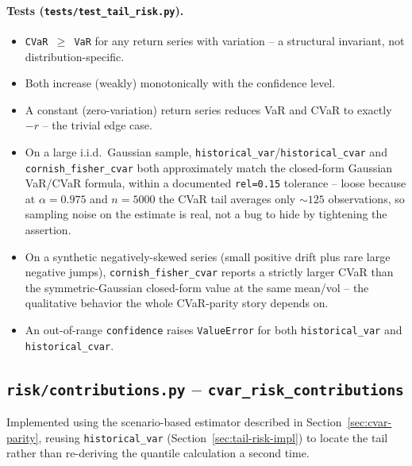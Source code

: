 \documentclass[11pt]{article}
\begin{document}
\paragraph{Tests (\texttt{tests/test\_tail\_risk.py}).}
\begin{itemize}
    \item \texttt{CVaR $\geq$ VaR} for any return series with variation
    -- a structural invariant, not distribution-specific.
    \item Both increase (weakly) monotonically with the confidence
    level.
    \item A constant (zero-variation) return series reduces VaR and
    CVaR to exactly $-r$ -- the trivial edge case.
    \item On a large i.i.d.\ Gaussian sample, \texttt{historical\_var}/\texttt{historical\_cvar}
    and \texttt{cornish\_fisher\_cvar} both approximately match the
    closed-form Gaussian VaR/CVaR formula, within a documented
    \texttt{rel=0.15} tolerance -- loose because at $\alpha=0.975$ and
    $n=5000$ the CVaR tail averages only $\sim 125$ observations, so
    sampling noise on the estimate is real, not a bug to hide by
    tightening the assertion.
    \item On a synthetic negatively-skewed series (small positive drift
    plus rare large negative jumps), \texttt{cornish\_fisher\_cvar}
    reports a strictly larger CVaR than the symmetric-Gaussian
    closed-form value at the same mean/vol -- the qualitative behavior
    the whole CVaR-parity story depends on.
    \item An out-of-range \texttt{confidence} raises \texttt{ValueError}
    for both \texttt{historical\_var} and \texttt{historical\_cvar}.
\end{itemize}

\subsection{\texttt{risk/contributions.py} -- \texttt{cvar\_risk\_contributions}}
\label{sec:cvar-contrib-impl}

Implemented using the scenario-based estimator described in
Section~\ref{sec:cvar-parity}, reusing \texttt{historical\_var}
(Section~\ref{sec:tail-risk-impl}) to locate the tail rather than
re-deriving the quantile calculation a second time.
\end{document}
